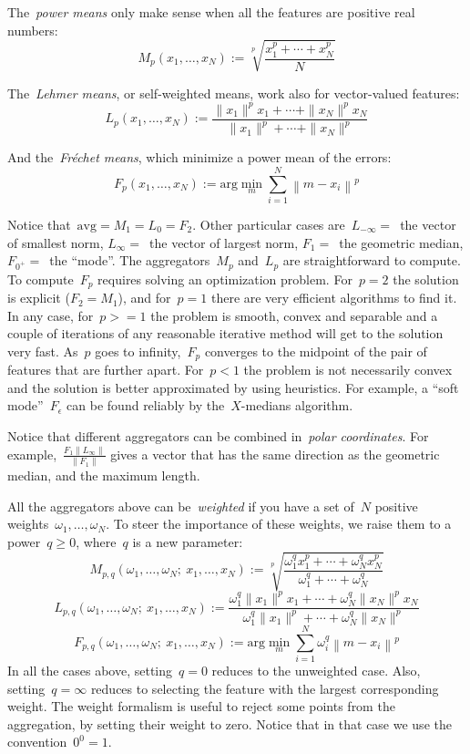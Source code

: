 \documentclass{article}
\begin{document}
The~\emph{power means} only make sense when all the features are positive
real numbers:
\[
	M_p(x_1,\ldots,x_N):=
	\sqrt[p]{ \frac{x_1^p+\cdots+x_N^p}{N} }
\]

The~\emph{Lehmer means}, or self-weighted means, work also for vector-valued features:
\[
	L_p(x_1,\ldots,x_N):=
	\frac
	{\|x_1\|^px_1+\cdots+\|x_N\|^px_N}
	{\|x_1\|^p+\cdots+\|x_N\|^p}
\]

And the~\emph{Fréchet means}, which minimize a power mean of the errors:
\[
	F_p(x_1,\ldots,x_N):=
	\mathrm{arg}\min_{m}\sum_{i=1}^N
	\left\|
	m-x_i
	\right\|^p
\]

Notice that~$\mathrm{avg}=M_1=L_0=F_2$.  Other particular cases
are~$L_{-\infty}=$~the vector of smallest norm, $L_{\infty}=$~the vector of
largest norm, $F_1=$~the geometric median, $F_{0^+}=$~the ``mode''.  The
aggregators~$M_p$ and~$L_p$ are straightforward to compute.  To compute~$F_p$
requires solving an optimization problem.  For~$p=2$ the solution is explicit
($F_2=M_1$), and for~$p=1$ there are very efficient algorithms to find it.
In any case, for~$p>=1$ the problem is smooth, convex and separable and a
couple of iterations of any reasonable iterative method will get to the
solution very fast.  As~$p$ goes to infinity,~$F_p$ converges to the midpoint
of the pair of features that are further apart.  For~$p<1$ the problem is not
necessarily convex and the solution is better approximated by using
heuristics.  For example, a ``soft mode''~$F_\epsilon$ can be found reliably
by the~$X$-medians algorithm.

Notice that different aggregators can be combined in~\emph{polar
coordinates}.  For example,~$\displaystyle \frac{F_1\|L_\infty\|}{\|F_1\|}$
gives a vector that has the same direction as the geometric median, and the
maximum length.

\bigskip

All the aggregators above can be~\emph{weighted} if you have a set
of~$N$ positive weights~$\omega_1,\ldots,\omega_N$.  To steer the importance
of these weights, we raise them to a power~$q\ge0$, where~$q$ is a new
parameter:
\[
	M_{p,q}(\omega_1,\ldots,\omega_N;\ x_1,\ldots,x_N):=
	\sqrt[p]{
	\frac{\omega_1^qx_1^p+\cdots+\omega_N^qx_N^p}
	{\omega_1^q+\cdots+\omega_N^q} }
\]
\[
	L_{p,q}(\omega_1,\ldots,\omega_N;\ x_1,\ldots,x_N):=
	\frac
	{\omega_1^q\|x_1\|^px_1+\cdots+\omega_N^q\|x_N\|^px_N}
	{\omega_1^q\|x_1\|^p+\cdots+\omega_N^q\|x_N\|^p}
\]
\[
	F_{p,q}(\omega_1,\ldots,\omega_N;\ x_1,\ldots,x_N):=
	\mathrm{arg}\min_{m}\sum_{i=1}^N
	\omega_i^q
	\left\|
	m-x_i
	\right\|^p
\]
In all the cases above, setting~$q=0$ reduces to the unweighted case.  Also,
setting~$q=\infty$ reduces to selecting the feature with the largest
corresponding weight.  The weight formalism is useful to reject some points
from the aggregation, by setting their weight to zero.  Notice that in that
case we use the convention~$0^0=1$.
\end{document}
